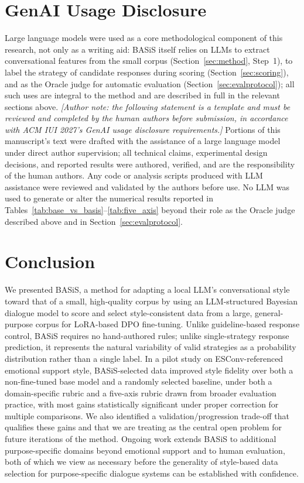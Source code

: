\documentclass[manuscript,review,anonymous]{acmart}
\begin{document}
\section*{GenAI Usage Disclosure}
Large language models were used as a core methodological component of this research, not only as a writing aid: BASiS itself relies on LLMs to extract conversational features from the small corpus (Section~\ref{sec:method}, Step~1), to label the strategy of candidate responses during scoring (Section~\ref{sec:scoring}), and as the Oracle judge for automatic evaluation (Section~\ref{sec:evalprotocol}); all such uses are integral to the method and are described in full in the relevant sections above. \emph{[Author note: the following statement is a template and must be reviewed and completed by the human authors before submission, in accordance with ACM IUI 2027's GenAI usage disclosure requirements.]} Portions of this manuscript's text were drafted with the assistance of a large language model under direct author supervision; all technical claims, experimental design decisions, and reported results were authored, verified, and are the responsibility of the human authors. Any code or analysis scripts produced with LLM assistance were reviewed and validated by the authors before use. No LLM was used to generate or alter the numerical results reported in Tables~\ref{tab:base_vs_basis}--\ref{tab:five_axis} beyond their role as the Oracle judge described above and in Section~\ref{sec:evalprotocol}.


\section{Conclusion}
We presented BASiS, a method for adapting a local LLM's conversational style toward that of a small, high-quality corpus by using an LLM-structured Bayesian dialogue model to score and select style-consistent data from a large, general-purpose corpus for LoRA-based DPO fine-tuning. Unlike guideline-based response control, BASiS requires no hand-authored rules; unlike single-strategy response prediction, it represents the natural variability of valid strategies as a probability distribution rather than a single label. In a pilot study on ESConv-referenced emotional support style, BASiS-selected data improved style fidelity over both a non-fine-tuned base model and a randomly selected baseline, under both a domain-specific rubric and a five-axis rubric drawn from broader evaluation practice, with most gains statistically significant under proper correction for multiple comparisons. We also identified a validation/progression trade-off that qualifies these gains and that we are treating as the central open problem for future iterations of the method. Ongoing work extends BASiS to additional purpose-specific domains beyond emotional support and to human evaluation, both of which we view as necessary before the generality of style-based data selection for purpose-specific dialogue systems can be established with confidence.
\end{document}

